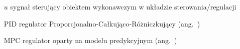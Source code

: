 \begin{itemize}
\item[$u$] sygnał sterujący obiektem wykonawczym w układzie sterowania/regulacji
\item[PID] regulator Proporcjonalno-Całkująco-Różniczkujący (ang.~)
\item[MPC] regulator oparty na modelu predykcyjnym (ang.~)
\end{itemize}